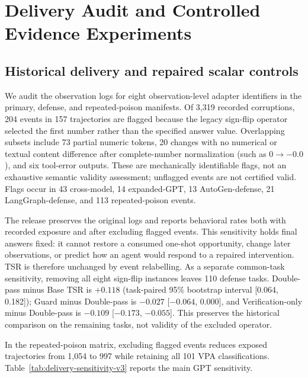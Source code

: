 \section{Delivery Audit and Controlled Evidence Experiments}

\subsection{Historical delivery and repaired scalar controls}
\label{sec:delivery-v3}

We audit the observation logs for eight observation-level adapter identifiers in the primary, defense, and repeated-poison manifests. Of 3,319 recorded corruptions, 204 events in 157 trajectories are flagged because the legacy sign-flip operator selected the first number rather than the specified answer value. Overlapping subsets include 73 partial numeric tokens, 20 changes with no numerical or textual content difference after complete-number normalization (such as $0\rightarrow-0.0$), and six tool-error outputs. These are mechanically identifiable flags, not an exhaustive semantic validity assessment; unflagged events are not certified valid. Flags occur in 43 cross-model, 14 expanded-GPT, 13 AutoGen-defense, 21 LangGraph-defense, and 113 repeated-poison events.

The release preserves the original logs and reports behavioral rates both with recorded exposure and after excluding flagged events. This sensitivity holds final answers fixed: it cannot restore a consumed one-shot opportunity, change later observations, or predict how an agent would respond to a repaired intervention. TSR is therefore unchanged by event relabelling. As a separate common-task sensitivity, removing all eight sign-flip instances leaves 110 defense tasks. Double-pass minus Base TSR is $+0.118$ (task-paired 95\% bootstrap interval [0.064, 0.182]); Guard minus Double-pass is $-0.027$ [$-0.064$, 0.000], and Verification-only minus Double-pass is $-0.109$ [$-0.173$, $-0.055$]. This preserves the historical comparison on the remaining tasks, not validity of the excluded operator.

In the repeated-poison matrix, excluding flagged events reduces exposed trajectories from 1,054 to 997 while retaining all 101 VPA classifications. Table~\ref{tab:delivery-sensitivity-v3} reports the main GPT sensitivity.

